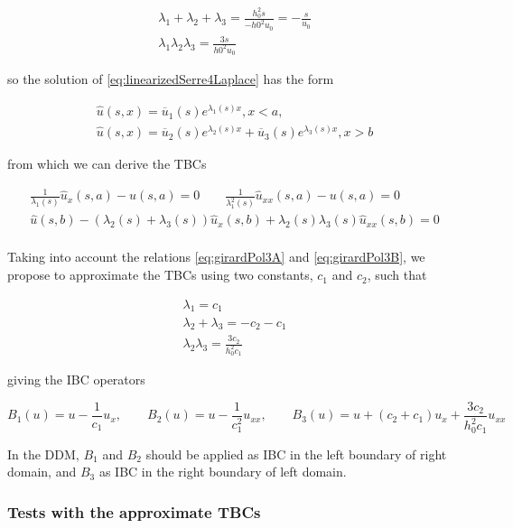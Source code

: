 \begin{gather}
	\label{eq:girardPol3A}
		\lambda_1 + \lambda_2 + \lambda_3 = \frac{h_0^2s}{- h0^2u_0} = -\frac{s}{u_0} \\
	\label{eq:girardPol3B}
		\lambda_1 \lambda_2 \lambda_3 = \frac{3s}{h0^2u_0}
\end{gather}

\noindent so the solution of \eqref{eq:linearizedSerre4Laplace} has the form

\begin{gather*}
	\hat{u}(s,x) = \overline{u}_1(s)e^{\lambda_1(s)x}, x < a, \\
	\hat{u}(s,x) = \overline{u}_2(s)e^{\lambda_2(s)x} + \overline{u}_3(s)e^{\lambda_3(s)x}, x > b
\end{gather*}

\noindent from which we can derive the TBCs

\begin{gather*}
\frac{1}{\lambda_1(s)}\hat{u}_{x}(s,a) - u(s,a) = 0 \qquad \frac{1}{\lambda_1^2(s)}\hat{u}_{xx}(s,a) - u(s,a) = 0 \\
\hat{u}(s,b) - (\lambda_2(s) + \lambda_3(s))\hat{u}_x(s,b) + \lambda_2(s) \lambda_3(s)\hat{u}_{xx}(s,b) = 0 \\
\end{gather*}

\indent Taking into account the relations \eqref{eq:girardPol3A} and \eqref{eq:girardPol3B}, we propose to approximate the TBCs using two constants, $c_1$ and $c_2$, such that

\begin{gather*}
	\lambda_1 = c_1 \\
	\lambda_2 + \lambda_3 = - c_2 - c_1 \\
	\lambda_2 \lambda_3 = \frac{3c_2}{h_0^2c_1}
\end{gather*}

\noindent giving the IBC operators

\begin{equation}
	B_1(u) = u - \frac{1}{c_1}u_{x}, \qquad B_2(u) = u - \frac{1}{c_1^2}u_{xx}, \qquad B_3(u) = u + (c_2+c_1)u_x + \frac{3c_2}{h_0^2c_1} u_{xx}
\end{equation}

\indent In the DDM, $B_1$ and $B_2$ should be applied as IBC in the left boundary of right domain, and $B_3$ as IBC in the right boundary of left domain.


\subsubsection{Tests with the approximate TBCs}

